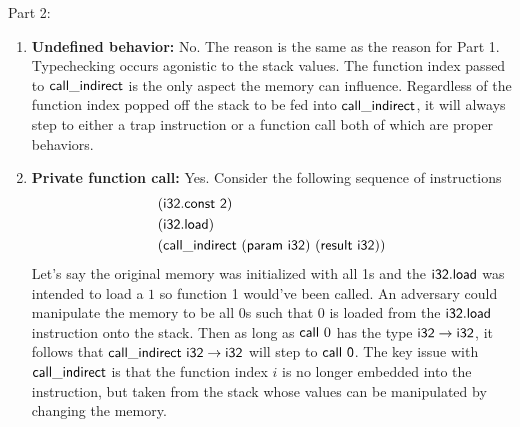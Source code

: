 \documentclass[11pt]{article}
\begin{document}
Part 2:

\begin{enumerate}
\item \textbf{Undefined behavior:} No. The reason is the same as the reason for Part 1. Typechecking occurs agonistic to the stack values. The function index passed to $\mathsf{call\_indirect}$ is the only aspect the memory can influence. Regardless of the function index popped off the stack to be fed into $\mathsf{call\_indirect}$, it will always step to either a trap instruction or a function call both of which are proper behaviors. 


\item \textbf{Private function call:} Yes. Consider the following sequence of instructions 
\begin{align*}
&(\mathsf{i32.const~2})\\
&(\mathsf{i32.load})\\
&(\mathsf{call\_indirect~(param~i32)~(result~i32)})
\end{align*}
Let's say the original memory was initialized with all 1s and the $\mathsf{i32.load}$ was intended to load a $1$ so function 1 would've been called. An adversary could manipulate the memory to be all 0s such that $0$ is loaded from the $\mathsf{i32.load}$ instruction onto the stack. Then as long as $\mathsf{call}~{0}$ has the type $\mathsf{i32} \rightarrow \mathsf{i32}$, it follows that $\mathsf{call\_indirect~i32} \rightarrow \mathsf{i32}$ will step to $\mathsf{call~0}$. The key issue with $\mathsf{call\_indirect}$ is that the function index $i$ is no longer embedded into the instruction, but taken from the stack whose values can be manipulated by changing the memory. 
\end{enumerate}
\end{document}
